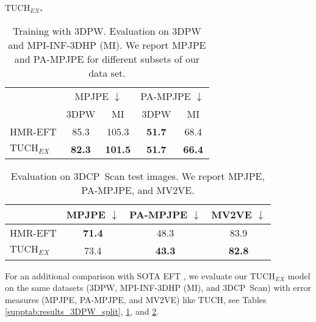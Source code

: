 \documentclass[final]{cvpr}
\newcommand{\threedcpscan}{\mbox{3DCP Scan}\xspace}
\theoremstyle{definition}
\begin{document}
\textbf{$\text{TUCH}_{\mathit{EX}}$.} 
\begin{table}
	\begin{center}
		\setlength\tabcolsep{2pt}
		\setlength{\extrarowheight}{2pt}
		\begin{tabular}{lcccc}
			\toprule[1pt]
			& \multicolumn{2}{c}{MPJPE $\downarrow$}     & \multicolumn{2}{c}{PA-MPJPE $\downarrow$}  \\  \cline{2-5} 
			& 3DPW & MI        & 3DPW & MI      \\   
			\hline
			HMR-EFT \cite{joo2020eft}        & 85.3          & 105.3               & \textbf{51.7}          & 68.4          \\
			$\text{TUCH}_{\mathit{EX}}$  & \textbf{82.3} & \textbf{101.5}          & \textbf{51.7} & \textbf{66.4}         \\
			\bottomrule[1pt]
		\end{tabular}
	\end{center}
	\caption{Training with 3DPW. Evaluation on 3DPW and MPI-INF-3DHP (MI). We report MPJPE and PA-MPJPE for different subsets of our data set.}
	\label{supptab:results_w3dpw}
\end{table}
\begin{table}
	\begin{center}
		\setlength\tabcolsep{2pt}
		\setlength{\extrarowheight}{2pt}
		\begin{tabular}{lccc}
			\toprule[1pt]
		               & MPJPE $\downarrow$ & PA-MPJPE $\downarrow$ & MV2VE $\downarrow$ \\
		    \hline
			      HMR-EFT \cite{joo2020eft}   & \textbf{71.4}           & 48.3              & 83.9  \\
			$\text{TUCH}_{\mathit{EX}}$   & 73.4           & \textbf{43.3}              & \textbf{82.8}       \\
			\bottomrule[1pt]  
		\end{tabular}
	\end{center}
	\caption{Evaluation on \threedcpscan test images. We report MPJPE, PA-MPJPE, and MV2VE. }
	\label{supptab:threedcpscanResult}
\end{table}

For an additional comparison with SOTA EFT
\cite{joo2020eft}, we evaluate our $\text{TUCH}_{\mathit{EX}}$ model
on the same datasets (3DPW, MPI-INF-3DHP (MI), and \threedcpscan) with error
measures (MPJPE, PA-MPJPE, and MV2VE) like TUCH, see Tables
\ref{supptab:results_3DPW_split}, \ref{supptab:results_w3dpw}, and
\ref{supptab:threedcpscanResult}. 
\end{document}
